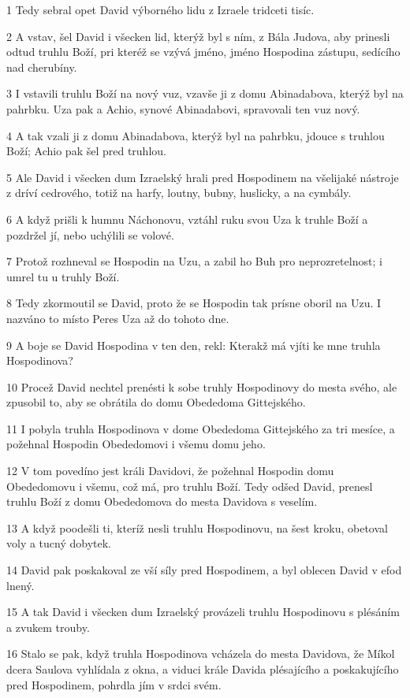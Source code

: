 \par 1 Tedy sebral opet David výborného lidu z Izraele tridceti tisíc.
\par 2 A vstav, šel David i všecken lid, kterýž byl s ním, z Bála Judova, aby prinesli odtud truhlu Boží, pri kteréž se vzývá jméno, jméno Hospodina zástupu, sedícího nad cherubíny.
\par 3 I vstavili truhlu Boží na nový vuz, vzavše ji z domu Abinadabova, kterýž byl na pahrbku. Uza pak a Achio, synové Abinadabovi, spravovali ten vuz nový.
\par 4 A tak vzali ji z domu Abinadabova, kterýž byl na pahrbku, jdouce s truhlou Boží; Achio pak šel pred truhlou.
\par 5 Ale David i všecken dum Izraelský hrali pred Hospodinem na všelijaké nástroje z dríví cedrového, totiž na harfy, loutny, bubny, huslicky, a na cymbály.
\par 6 A když prišli k humnu Náchonovu, vztáhl ruku svou Uza k truhle Boží a pozdržel jí, nebo uchýlili se volové.
\par 7 Protož rozhneval se Hospodin na Uzu, a zabil ho Buh pro neprozretelnost; i umrel tu u truhly Boží.
\par 8 Tedy zkormoutil se David, proto že se Hospodin tak prísne oboril na Uzu. I nazváno to místo Peres Uza až do tohoto dne.
\par 9 A boje se David Hospodina v ten den, rekl: Kterakž má vjíti ke mne truhla Hospodinova?
\par 10 Procež David nechtel prenésti k sobe truhly Hospodinovy do mesta svého, ale zpusobil to, aby se obrátila do domu Obededoma Gittejského.
\par 11 I pobyla truhla Hospodinova v dome Obededoma Gittejského za tri mesíce, a požehnal Hospodin Obededomovi i všemu domu jeho.
\par 12 V tom povedíno jest králi Davidovi, že požehnal Hospodin domu Obededomovu i všemu, což má, pro truhlu Boží. Tedy odšed David, prenesl truhlu Boží z domu Obededomova do mesta Davidova s veselím.
\par 13 A když poodešli ti, kteríž nesli truhlu Hospodinovu, na šest kroku, obetoval voly a tucný dobytek.
\par 14 David pak poskakoval ze vší síly pred Hospodinem, a byl oblecen David v efod lnený.
\par 15 A tak David i všecken dum Izraelský provázeli truhlu Hospodinovu s plésáním a zvukem trouby.
\par 16 Stalo se pak, když truhla Hospodinova vcházela do mesta Davidova, že Míkol dcera Saulova vyhlídala z okna, a viduci krále Davida plésajícího a poskakujícího pred Hospodinem, pohrdla jím v srdci svém.
